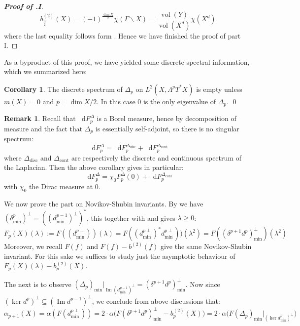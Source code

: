 \documentclass[11pt]{report}
\theoremstyle{definition}
\newtheorem{Cor}[Def]{Corollary}
\newtheorem{Rmk}{Remark}[chapter]
\theoremstyle{plain}
\DeclareMathOperator{\im}{Im}
\DeclareMathOperator{\vol}{vol}
\newcommand{\mass}[1]{\mathop{}\mathrm{d}{#1}}
\begin{document}
\begin{proof}[\textbf{Proof of .I}]
	\begin{equation}
	b^{(2)}_{\frac{n}{2}}(X)=(-1)^{\frac{\dim X}{2}}\chi(\Gamma \backslash X)=\frac{\vol(Y)}{\vol(X^d)}\chi(X^d)
	\end{equation}
	where the last equality follows form . Hence we have finished the proof of part I.
\end{proof}
As a byproduct of this proof, we have yielded some discrete spectral information, which we summarized here:
\begin{Cor}
	The discrete spectrum of $\Delta_p$ on $L^2(X, \Lambda^pT^*X)$ is empty unless $m(X)=0$ and $p=\dim X/2$. In this case $0$ is the only eigenvalue of $\Delta_p$. \qed
\end{Cor}
\begin{Rmk}
	Recall  that $\mass{F^\Delta_p}$ is a Borel measure, hence by decomposition of measure and the fact that $\Delta_p$ is essentially self-adjoint, so there is no singular spectrum: 
	\begin{equation}
	\mass{F^\Delta_p}=\mass{F_p^{\Delta_{\mathrm{disc}}}}+\mass{F_p^{\Delta_\mathrm{cont}}}
	\end{equation}
	where $\Delta_{\mathrm{disc}}$ and $\Delta_\mathrm{cont}$ are respectively the discrete and continuous spectrum of the Laplacian. Then the above corollary gives in particular:
	\begin{equation}
	\mass{F^\Delta_p}=\chi_0 F^\Delta_p(0)+\mass{F_p^{\Delta_\mathrm{cont}}}
	\end{equation}
	with $\chi_0$ the Dirac measure at $0$. 
\end{Rmk}
We now prove the part on Novikov-Shubin invariants. By  we have $(\delta^p_{\min})^\perp=((d^{p-1}_{\min})^\perp)^*$, this together with  and  gives $\lambda\geq 0$:
\begin{equation*}
F_p(X)(\lambda):=F((d^{p\perp}_{\min}))(\lambda)=F((d^{p\perp}_{\min})^*d^{p\perp}_{\min}))(\lambda^2)=F((\delta^{p+1}d^p)^\perp_{\min})(\lambda^2)
\end{equation*}
Moreover, we recall $F(f)$ and $F(f)-b^{(2)}(f)$ give the same Novikov-Shubin invariant. For this sake we suffices to study just the asymptotic behaviour of $F_{p}(X)(\lambda)-b^{(2)}_{p}(X)$. 
\par The next is to observe $(\Delta_p)_{\min}|_{\im(d^{p-1}_{\min})^\perp}=(\delta^{p+1}d^p)_{\min}^\perp$. Now since $(\ker d^{p})^\perp\subseteq (\im d^{p-1})^\perp$, we conclude from above discussions that:
\begin{equation}
\alpha_{p+1}(X)=\alpha(F(d^{p\perp}_{\min}))=2\cdot \alpha\Big(F(\delta^{p+1}d^p)_{\min}^\perp-b^{(2)}_p(X)\Big)=2\cdot \alpha\Big(F(\Delta_p)_{\min}|_{(\ker d^p_{\min})^\perp}\Big) 
\end{equation}
\end{document}
